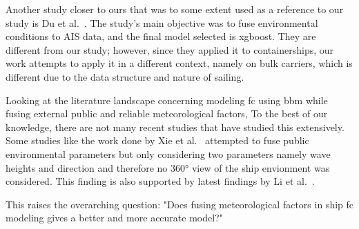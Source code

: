 Another study closer to ours that was to some extent used as a reference to our study is Du et al.~\citep{duDataFusionMachine2022a}. 
The study's main objective was to fuse environmental conditions to AIS data, and the final model selected is \ac{xgboost}. They are different from our study; however, since they applied it to containerships, our work attempts to apply it in a different context, namely on bulk carriers, which is different due to the data structure and nature of sailing.

Looking at the literature landscape concerning modeling \ac{fc} using \ac{bbm} while fusing external public and reliable meteorological factors, 
To the best of our knowledge, there are not many recent studies that have studied this extensively. Some studies like the work done by Xie et al.~\citep{xieFuelConsumptionPrediction2023} attempted to fuse public environmental parameters but only considering two parameters namely wave heights and direction and therefore no 360° view of the ship envionment was considered.  
This finding is also supported by latest findings by Li et al.~\citep{liDataFusionMachine2022}. 

This raises the overarching question: "Does fusing meteorological factors in ship \ac{fc} modeling gives a better and more accurate model?"

\clearpage